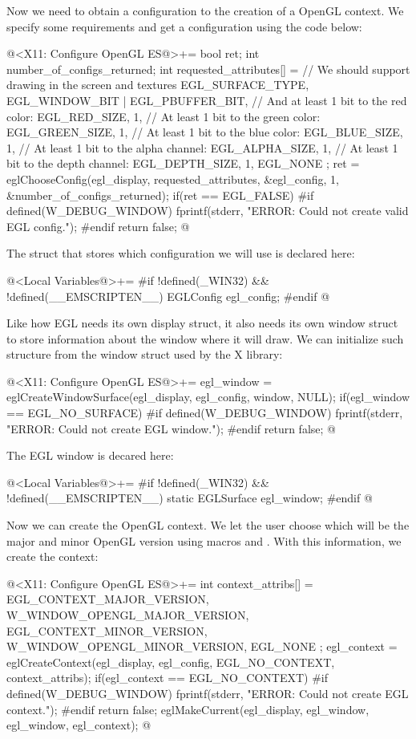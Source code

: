 Now we need to obtain a configuration to the creation of a OpenGL
context. We specify some requirements and get a configuration using
the code below:

\iniciocodigo
@<X11: Configure OpenGL ES@>+=
{
  bool ret;
  int number_of_configs_returned;
  int requested_attributes[] = {
    // We should support drawing in the screen and textures
    EGL_SURFACE_TYPE,  EGL_WINDOW_BIT | EGL_PBUFFER_BIT,
    // And at least 1 bit to the red color:
    EGL_RED_SIZE, 1,
    // At least 1 bit to the green color:
    EGL_GREEN_SIZE, 1,
    // At least 1 bit to the blue color:
    EGL_BLUE_SIZE, 1,
    // At least 1 bit to the alpha channel:
    EGL_ALPHA_SIZE, 1,
    // At least 1 bit to the depth channel:
    EGL_DEPTH_SIZE, 1,
    EGL_NONE
  };
  ret = eglChooseConfig(egl_display, requested_attributes,
                        &egl_config, 1, &number_of_configs_returned);
  if(ret == EGL_FALSE){
#if defined(W_DEBUG_WINDOW)
    fprintf(stderr, "ERROR: Could not create valid EGL config.\n");
#endif
    return false;
  }
}
@
\fimcodigo

The struct that stores which configuration we will use is declared
here:

\iniciocodigo
@<Local Variables@>+=
#if !defined(_WIN32) && !defined(__EMSCRIPTEN__)
EGLConfig egl_config;
#endif
@
\fimcodigo


Like how EGL needs its own display struct, it also needs its own
window struct to store information about the window where it will
draw. We can initialize such structure from the window struct used by
the X library:

\iniciocodigo
@<X11: Configure OpenGL ES@>+=
egl_window = eglCreateWindowSurface(egl_display, egl_config,
                                    window, NULL);
if(egl_window == EGL_NO_SURFACE){
#if defined(W_DEBUG_WINDOW)
  fprintf(stderr, "ERROR: Could not create EGL window.\n");
#endif
  return false;
}
@
\fimcodigo

The EGL window is decared here:

\iniciocodigo
@<Local Variables@>+=
#if !defined(_WIN32) && !defined(__EMSCRIPTEN__)
static EGLSurface egl_window;
#endif
@
\fimcodigo


Now we can create the OpenGL context. We let the user choose which
will be the major and minor OpenGL version using
macros  and
. With this information, we create the context:

\iniciocodigo
@<X11: Configure OpenGL ES@>+=
{
  int context_attribs[] = {
    EGL_CONTEXT_MAJOR_VERSION, W_WINDOW_OPENGL_MAJOR_VERSION,
    EGL_CONTEXT_MINOR_VERSION, W_WINDOW_OPENGL_MINOR_VERSION,
    EGL_NONE
  };
  egl_context = eglCreateContext(egl_display, egl_config,
                                 EGL_NO_CONTEXT, context_attribs);
  if(egl_context == EGL_NO_CONTEXT){
#if defined(W_DEBUG_WINDOW)
    fprintf(stderr, "ERROR: Could not create EGL context.\n");
#endif
    return false;
  }
  eglMakeCurrent(egl_display, egl_window, egl_window, egl_context);
}
@
\fimcodigo

